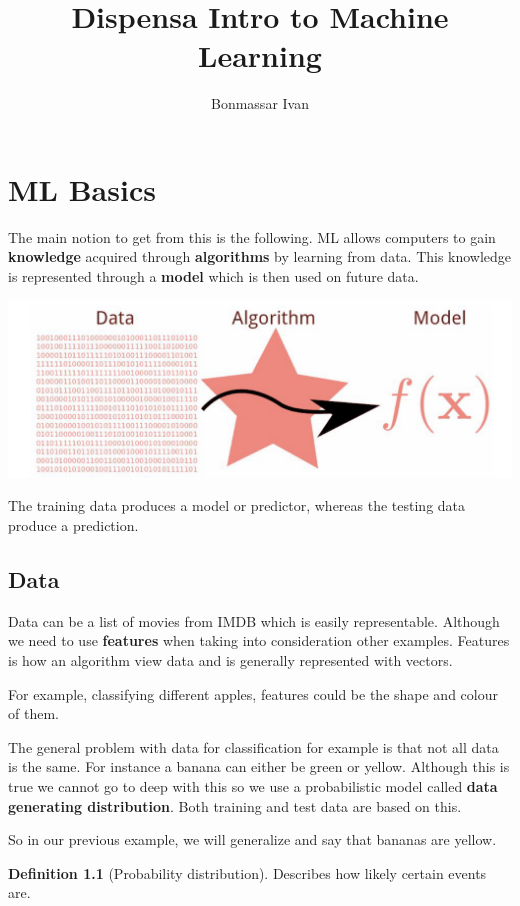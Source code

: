 \documentclass[oneside]{book}
\title{Dispensa Intro to Machine Learning}
\author{Bonmassar Ivan}
\theoremstyle{definition}
\newtheorem{definition}{Definition}[section]
\begin{document}
	\maketitle
	\tableofcontents
	
\chapter{ML Basics}
The main notion to get from this is the following. ML allows computers to gain \textbf{knowledge} acquired through \textbf{algorithms} by learning from data. This knowledge is represented through a \textbf{model} which is then used on future data.

\includegraphics[scale=0.25]{data_model}

The training data produces a model or predictor, whereas the testing data produce a prediction. 
\section{Data}
Data can be a list of movies from IMDB which is easily representable. Although we need to use \textbf{features} when taking into consideration other examples. Features is how an algorithm view data and is generally represented with vectors. 

For example, classifying different apples, features could be the shape and colour of them.

The general problem with data for classification for example is that not all data is the same. For instance a banana can either be green or yellow. Although this is true we cannot go to deep with this so we use a probabilistic model called \textbf{data generating distribution}. Both training and test data are based on this. 

So in our previous example, we will generalize and say that bananas are yellow. 

\begin{definition}[Probability distribution]
	Describes how likely certain events are.
\end{definition}
\end{document}
